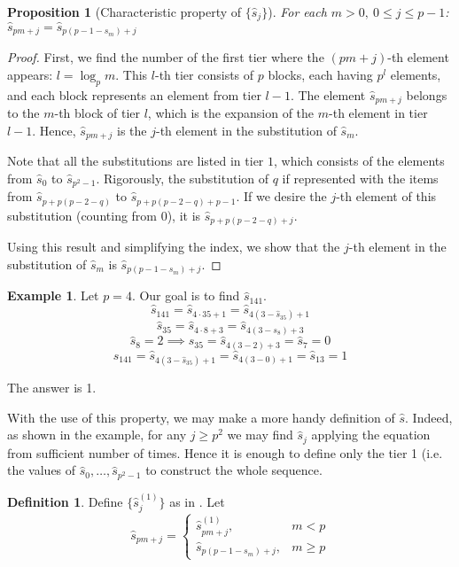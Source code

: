 \documentclass[a4paper]{article}
\theoremstyle{plain}
\newtheorem{proposition}{Proposition}[section]
\theoremstyle{definition}
\newtheorem{definition}{Definition}
\newtheorem*{example}{Example}
\begin{document}
\begin{proposition}[Characteristic property of $\{\hat{s}_j\}$]\label{charProp}
For each $m > 0,\ 0 \le j \le p-1$: $\hat{s}_{pm+j}=\hat{s}_{p(p-1-s_m) + j}$
\end{proposition}
\begin{proof}
First, we find the number of the first tier where the $(pm+j)$-th element appears: $l = \log_p{m}$. This $l$-th tier consists of $p$ blocks, each having $p^l$ elements, and each block represents an element from tier $l-1$. The element  $\hat{s}_{pm+j}$ belongs to the $m$-th block of tier $l$, which is the expansion of the $m$-th element in  tier $l-1$. Hence,  
$\hat{s}_{pm+j}$ is the $j$-th element in the substitution of $\hat{s}_m$.

Note that all the substitutions are listed in tier $1$, which consists of the elements from $\hat{s}_0$ to $\hat{s}_{p^2-1}$.
Rigorously, the substitution of $q$ if represented with the items from $\hat{s}_{p + p(p-2-q)}$ to $\hat{s}_{p + p(p-2-q) + p-1}$. If we desire the $j$-th element of this substitution (counting from 0), it is $\hat{s}_{p + p(p-2-q) + j}$. 

Using this result and simplifying the index, we show that the $j$-th element in the substitution of $\hat{s}_m$ is $\hat{s}_{p(p-1-s_m) + j}$. 
\end{proof}
\begin{example}
Let $p=4$. Our goal is to find $\hat{s}_{141}$.
$$ \hat{s}_{141} = \hat{s}_{4 \cdot 35 + 1} = \hat{s}_{4(3-\hat{s}_{35}) +1}$$
$$ \hat{s}_{35} = \hat{s}_{4 \cdot 8 + 3} = \hat{s}_{4(3-s_{8}) +3}$$
$$\hat{s}_8 = 2 \implies \hat{s}_{35}=\hat{s}_{4(3-2)+3}=\hat{s}_7=0$$
$$\hat{s}_{141}=\hat{s}_{4(3-\hat{s}_{35}) +1} = \hat{s}_{4(3-0)+1} = \hat{s}_{13}=1$$

The answer is 1.

\end{example}

With the use of this property, we may make a more handy definition of $\hat{s}$. Indeed, as shown in the example, for any $j \ge p^2$ we may find $\hat{s}_j$ applying the equation from  sufficient number of times. Hence it is enough to define only the tier 1 (i.e. the values of $\hat{s}_0, \ldots, \hat{s}_{p^2-1}$ to construct the whole sequence.
\begin{definition}\label{sm_good_def}
Define $\{\hat{s}_j^{(1)}\}$ as in . Let
$$ \hat{s}_{pm+j} =
 \begin{cases}
     \hat{s}_{pm+j}^{(1)}, & m < p \\
     \hat{s}_{p(p-1-s_m) + j}, & m \ge p
 \end{cases}
$$
\end{definition}
\end{document}
